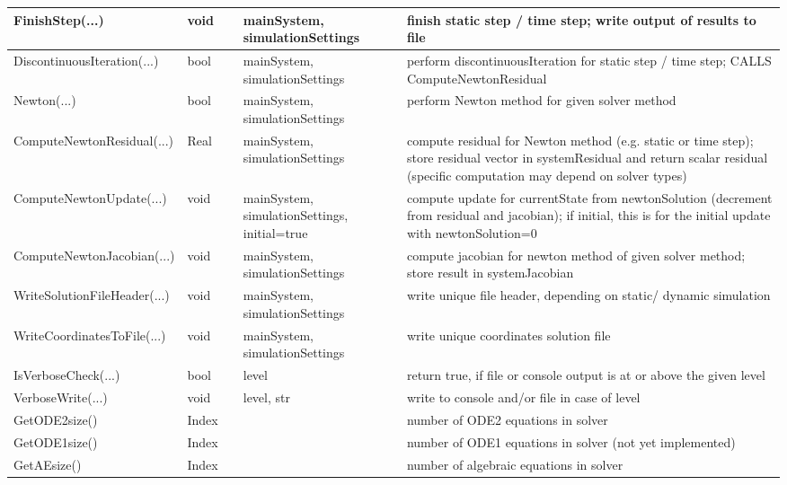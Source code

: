 \begin{center}
\begin{longtable}{| p{4.2cm} | p{2.5cm} | p{0.3cm} | p{3.0cm} | p{6cm} |}
    FinishStep(...) &     void &      &     mainSystem, simulationSettings &     finish static step / time step; write output of results to file\\ \hline
    DiscontinuousIteration(...) &     bool &      &     mainSystem, simulationSettings &     perform discontinuousIteration for static step / time step; CALLS ComputeNewtonResidual\\ \hline
    Newton(...) &     bool &      &     mainSystem, simulationSettings &     perform Newton method for given solver method\\ \hline
    ComputeNewtonResidual(...) &     Real &      &     mainSystem, simulationSettings &     compute residual for Newton method (e.g. static or time step); store residual vector in systemResidual and return scalar residual (specific computation may depend on solver types)\\ \hline
    ComputeNewtonUpdate(...) &     void &      &     mainSystem, simulationSettings, initial=true &     compute update for currentState from newtonSolution (decrement from residual and jacobian); if initial, this is for the initial update with newtonSolution=0\\ \hline
    ComputeNewtonJacobian(...) &     void &      &     mainSystem, simulationSettings &     compute jacobian for newton method of given solver method; store result in systemJacobian\\ \hline
    WriteSolutionFileHeader(...) &     void &      &     mainSystem, simulationSettings &     write unique file header, depending on static/ dynamic simulation\\ \hline
    WriteCoordinatesToFile(...) &     void &      &     mainSystem, simulationSettings &     write unique coordinates solution file\\ \hline
    IsVerboseCheck(...) &     bool &      &     level &     return true, if file or console output is at or above the given level\\ \hline
    VerboseWrite(...) &     void &      &     level, str &     write to console and/or file in case of level\\ \hline
    GetODE2size() &     Index &      &      &     number of ODE2 equations in solver\\ \hline
    GetODE1size() &     Index &      &      &     number of ODE1 equations in solver (not yet implemented)\\ \hline
    GetAEsize() &     Index &      &      &     number of algebraic equations in solver\\ \hline

\end{longtable}
\end{center}
